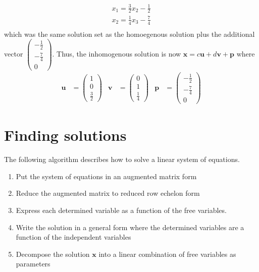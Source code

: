 \documentclass[
]{book}
\theoremstyle{definition}
\theoremstyle{definition}
\theoremstyle{definition}
\theoremstyle{remark}
\begin{document}
\[
\begin{aligned}
x_1 = \frac{3}{2} x_2  - \frac{1}{2}\\
x_2 = \frac{1}{4} x_3  - \frac{7}{4} \\
\end{aligned}
\]
which was the same solution set as the homoegenous solution plus the additional vector \(\begin{pmatrix} -\frac{1}{2} \\ -\frac{7}{4} \\ 0 \end{pmatrix}\). Thus, the inhomogenous solution is now \(\mathbf{x} = c \mathbf{u} + d \mathbf{v} + \mathbf{p}\) where
\[
\begin{aligned}
\mathbf{u} &= \begin{pmatrix} 1 \\ 0 \\ \frac{3}{2} \end{pmatrix} & 
\mathbf{v} &= \begin{pmatrix} 0 \\ 1 \\ \frac{1}{4} \end{pmatrix} & 
\mathbf{p} &= \begin{pmatrix} -\frac{1}{2} \\ -\frac{7}{4} \\ 0 \end{pmatrix} 
\end{aligned}
\]

\hypertarget{finding-solutions}{%
\section{Finding solutions}\label{finding-solutions}}

The following algorithm describes how to solve a linear system of equations.

\begin{enumerate}
\def\labelenumi{\arabic{enumi})}
\item
  Put the system of equations in an augmented matrix form
\item
  Reduce the augmented matrix to reduced row echelon form
\item
  Express each determined variable as a function of the free variables.
\item
  Write the solution in a general form where the determined variables are a function of the independent variables
\item
  Decompose the solution \(\mathbf{x}\) into a linear combination of free variables as parameters
\end{enumerate}
\end{document}
